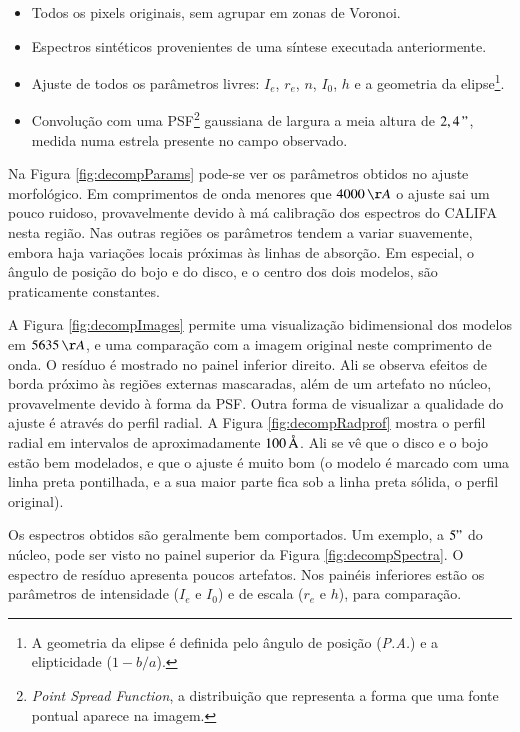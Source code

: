 \begin{itemize}

	\item Todos os pixels originais, sem agrupar em zonas de Voronoi.

	\item Espectros sintéticos provenientes de uma síntese executada anteriormente.

	\item Ajuste de todos os parâmetros livres: $I_e$, $r_e$, $n$, $I_0$, $h$ e a
	geometria da elipse\footnote{A geometria da elipse é definida pelo ângulo de
	posição ({\em P.A.}) e a elipticidade ($1 - b/a$).}.

	\item Convolução com uma PSF\footnote{{\em Point Spread Function}, a
	distribuição que representa a forma que uma fonte pontual aparece na imagem.}
	gaussiana de largura a meia altura de $2,4\,"$, medida numa estrela presente no
	campo observado.

\end{itemize}

Na Figura \ref{fig:decompParams} pode-se ver os parâmetros obtidos no ajuste
morfológico. Em comprimentos de onda menores que $4000\,\AA$ o ajuste sai um
pouco ruidoso, provavelmente devido à má calibração dos espectros do CALIFA
nesta região. Nas outras regiões os parâmetros tendem a variar suavemente,
embora haja variações locais próximas às linhas de absorção. Em especial, o
ângulo de posição do bojo e do disco, e o centro dos dois modelos, são
praticamente constantes.

A Figura \ref{fig:decompImages} permite uma visualização bidimensional dos
modelos em $5635\,\AA$, e uma comparação com a imagem original neste comprimento
de onda. O resíduo é mostrado no painel inferior direito. Ali se observa efeitos
de borda próximo às regiões externas mascaradas, além de um artefato no núcleo,
provavelmente devido à forma da PSF. Outra forma de visualizar a qualidade do
ajuste é através do perfil radial. A Figura \ref{fig:decompRadprof} mostra o
perfil radial em intervalos de aproximadamente $100\,\text{\normalfont\AA}$. Ali se vê que o
disco e o bojo estão bem modelados, e que o ajuste é muito bom (o modelo é
marcado com uma linha preta pontilhada, e a sua maior parte fica sob a linha
preta sólida, o perfil original).

Os espectros obtidos são geralmente bem comportados. Um exemplo, a $5"$ do
núcleo, pode ser visto no painel superior da Figura \ref{fig:decompSpectra}.
O espectro de resíduo apresenta poucos artefatos. Nos painéis inferiores estão
os parâmetros de intensidade ($I_e$ e $I_0$) e de escala ($r_e$ e $h$), para
comparação.

